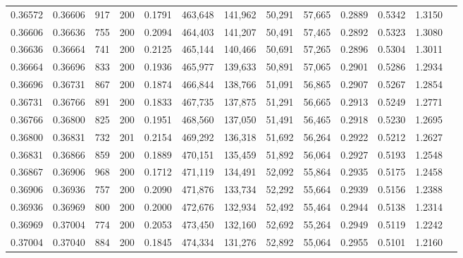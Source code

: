 \begin{tabular}{rrrrrrrrrrrrr}
0.36572 & 0.36606 &   917 & 200 &                                     0.1791 & 463,648 & 141,962 &  50,291 &  57,665 & 0.2889 & 0.5342 & 1.3150 \\
0.36606 & 0.36636 &   755 & 200 &                                     0.2094 & 464,403 & 141,207 &  50,491 &  57,465 & 0.2892 & 0.5323 & 1.3080 \\
0.36636 & 0.36664 &   741 & 200 &                                     0.2125 & 465,144 & 140,466 &  50,691 &  57,265 & 0.2896 & 0.5304 & 1.3011 \\
0.36664 & 0.36696 &   833 & 200 &                                     0.1936 & 465,977 & 139,633 &  50,891 &  57,065 & 0.2901 & 0.5286 & 1.2934 \\
0.36696 & 0.36731 &   867 & 200 &                                     0.1874 & 466,844 & 138,766 &  51,091 &  56,865 & 0.2907 & 0.5267 & 1.2854 \\
0.36731 & 0.36766 &   891 & 200 &                                     0.1833 & 467,735 & 137,875 &  51,291 &  56,665 & 0.2913 & 0.5249 & 1.2771 \\
0.36766 & 0.36800 &   825 & 200 &                                     0.1951 & 468,560 & 137,050 &  51,491 &  56,465 & 0.2918 & 0.5230 & 1.2695 \\
0.36800 & 0.36831 &   732 & 201 &                                     0.2154 & 469,292 & 136,318 &  51,692 &  56,264 & 0.2922 & 0.5212 & 1.2627 \\
0.36831 & 0.36866 &   859 & 200 &                                     0.1889 & 470,151 & 135,459 &  51,892 &  56,064 & 0.2927 & 0.5193 & 1.2548 \\
0.36867 & 0.36906 &   968 & 200 &                                     0.1712 & 471,119 & 134,491 &  52,092 &  55,864 & 0.2935 & 0.5175 & 1.2458 \\
0.36906 & 0.36936 &   757 & 200 &                                     0.2090 & 471,876 & 133,734 &  52,292 &  55,664 & 0.2939 & 0.5156 & 1.2388 \\
0.36936 & 0.36969 &   800 & 200 &                                     0.2000 & 472,676 & 132,934 &  52,492 &  55,464 & 0.2944 & 0.5138 & 1.2314 \\
0.36969 & 0.37004 &   774 & 200 &                                     0.2053 & 473,450 & 132,160 &  52,692 &  55,264 & 0.2949 & 0.5119 & 1.2242 \\
0.37004 & 0.37040 &   884 & 200 &                                     0.1845 & 474,334 & 131,276 &  52,892 &  55,064 & 0.2955 & 0.5101 & 1.2160 \\

\end{tabular}
